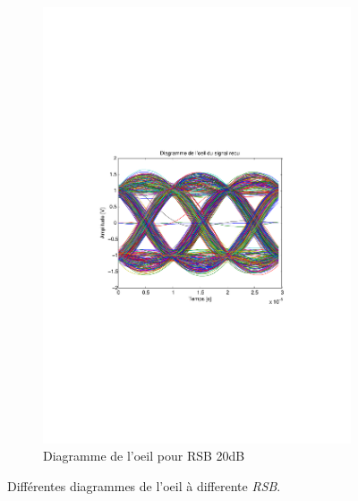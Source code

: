 \documentclass[a4paper,11pt]{article}
\begin{document}
\begin{figure}
\begin{subfigure}{.5\textwidth}
  		\includegraphics[width=1\linewidth]{Q10-EbNo20.pdf}
  		\caption{Diagramme de l'oeil pour RSB 20dB}
  		\label{fig:q10E20}
	\end{subfigure}
	\caption{Différentes diagrammes de l'oeil à differente \emph{RSB}.}
	\label{fig:q10E}
\end{figure}
\end{document}
